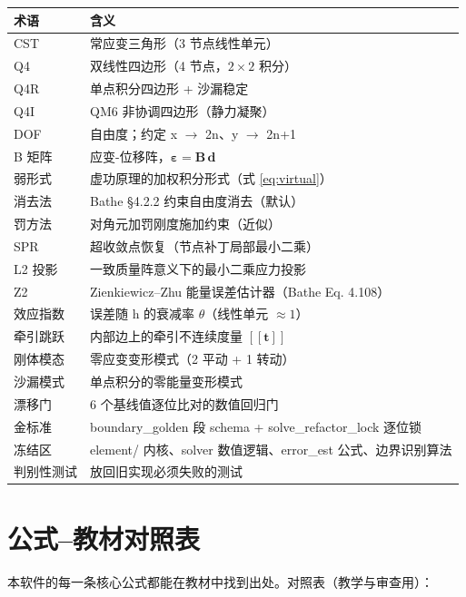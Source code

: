 \documentclass[12pt,a4paper]{ctexart}
\newcommand{\llbracket}{[\![}
\newcommand{\rrbracket}{]\!]}
\begin{document}
\begin{longtable}{p{3.0cm}p{11.8cm}}
\toprule
\textbf{术语} & \textbf{含义} \\
\midrule
CST & 常应变三角形（3 节点线性单元） \\
Q4 & 双线性四边形（4 节点，$2\times2$ 积分） \\
Q4R & 单点积分四边形 + 沙漏稳定 \\
Q4I & QM6 非协调四边形（静力凝聚） \\
DOF & 自由度；约定 x $\to$ 2n、y $\to$ 2n+1 \\
B 矩阵 & 应变-位移阵，$\boldsymbol{\varepsilon} = \mathbf{B}\,\mathbf{d}$ \\
弱形式 & 虚功原理的加权积分形式（式 \eqref{eq:virtual}） \\
消去法 & Bathe §4.2.2 约束自由度消去（默认） \\
罚方法 & 对角元加罚刚度施加约束（近似） \\
SPR & 超收敛点恢复（节点补丁局部最小二乘） \\
L2 投影 & 一致质量阵意义下的最小二乘应力投影 \\
Z2 & Zienkiewicz--Zhu 能量误差估计器（Bathe Eq. 4.108） \\
效应指数 & 误差随 h 的衰减率 $\theta$（线性单元 $\approx 1$） \\
牵引跳跃 & 内部边上的牵引不连续度量 $\llbracket\mathbf{t}\rrbracket$ \\
刚体模态 & 零应变变形模式（2 平动 + 1 转动） \\
沙漏模式 & 单点积分的零能量变形模式 \\
漂移门 & 6 个基线值逐位比对的数值回归门 \\
金标准 & boundary\_golden 段 schema + solve\_refactor\_lock 逐位锁 \\
冻结区 & element/ 内核、solver 数值逻辑、error\_est 公式、边界识别算法 \\
判别性测试 & 放回旧实现必须失败的测试 \\
\bottomrule
\end{longtable}

\section{公式--教材对照表}

本软件的每一条核心公式都能在教材中找到出处。对照表（教学与审查用）：
\end{document}
